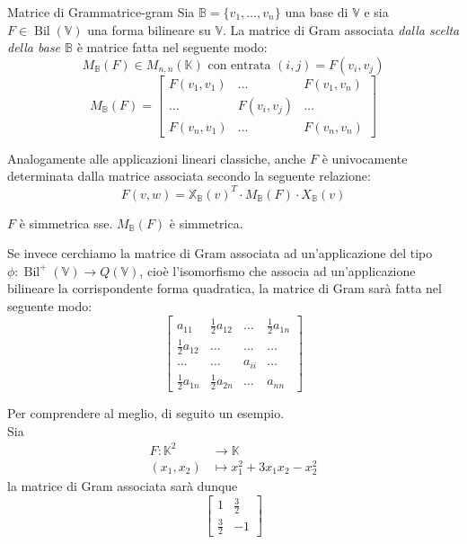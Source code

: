 \documentclass[12pt]{report}
\newcommand{\K}{\mathbb{K}}
\newcommand{\V}{\mathbb{V}}
\newcommand{\vectors}[1]{#1_1, \dots, #1_n}
\begin{document}
	\begin{definizione}{Matrice di Gram}{matrice-gram}
		Sia $\mathbb{B} = \{\vectors{v}\}$ una base di $\V$ e sia $F \in \operatorname{Bil}(\V)$ una forma bilineare su $\V$.
		La matrice di Gram associata \textit{dalla scelta della base $\mathbb{B}$} è matrice fatta nel seguente modo:
		\[
			M_\mathbb{B}(F) \in M_{n,n}(\K) \text{ con entrata } (i, j) = F(v_i, v_j)
		\]
		\[
			M_\mathbb{B}(F) = 
			\begin{bmatrix}
				F(v_1, v_1) & \dots & F(v_1, v_n)\\
				\dots & F(v_i, v_j) & \dots\\
				F(v_n, v_1) & \dots & F(v_n, v_n)
			\end{bmatrix}
		\]
		
		Analogamente alle applicazioni lineari classiche, anche $F$ è univocamente determinata dalla matrice associata secondo la seguente relazione:
		\[
			F(v, w) = \mathbb{X}_\mathbb{B}(v)^T \cdot M_\mathbb{B}(F) \cdot X_\mathbb{B}(v)
		\]
	\end{definizione}
	
	\begin{osservazione}{}{}
		$F$ è simmetrica sse. $M_\mathbb{B}(F)$ è simmetrica.
	\end{osservazione}
	
	Se invece cerchiamo la matrice di Gram associata ad un'applicazione del tipo $\phi: \operatorname{Bil}^+(\V) \to Q(\V)$, cioè l'isomorfismo che associa ad un'applicazione bilineare la corrispondente forma quadratica, la matrice di Gram sarà fatta nel seguente modo:
	\[
		\begin{bmatrix}
			a_{11} & \frac{1}{2}a_{12} & \dots & \frac{1}{2}a_{1n}\\
			\frac{1}{2}a_{12} & \dots & \dots & \dots\\
			\dots & \dots & a_{ii} & \dots\\
			\frac{1}{2}a_{1n} & \frac{1}{2}a_{2n} & \dots & a_{nn}
		\end{bmatrix}
	\]
	
	Per comprendere al meglio, di seguito un esempio.\\
	Sia 
	\[
		\begin{aligned}
			F: \K^2 &\to \K\\
			(x_1, x_2) &\mapsto x_{1}^{2} + 3x_1x_2 - x_{2}^{2}
		\end{aligned}
	\]
	la matrice di Gram associata sarà dunque
	\[
		\begin{bmatrix}
			1 & \frac{3}{2}\\
			\frac{3}{2} & -1
		\end{bmatrix}
	\]
	
\end{document}
